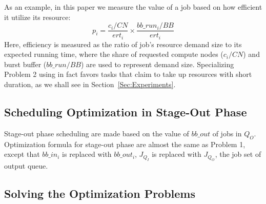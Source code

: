 As an example, in this paper we measure the value of a job based on how efficient it utilize its resource:
\begin{equation}
        p_i = \frac{c_i / CN}{ert_i} \times \frac{bb\_run_i / BB}{ert_i}
        \label{Equ:DefValue}
\end{equation}
Here, efficiency is measured as the ratio of job's resource demand size to its expected running time,
where the share of requested compute nodes ($c_i/CN$) and burst buffer ($bb\_run/BB$) are used to
represent demand size.
Specializing Problem 2 using  in fact favors tasks that claim to take up resources with short duration, as we shall see in Section~\ref{Sec:Experiments}.

\subsection{Scheduling Optimization in Stage-Out Phase}

Stage-out phase scheduling are made based on the value of $bb\_out$ of jobs in $Q_O$.
Optimization formula for stage-out phase are almost the same as
Problem 1, except that $bb\_in_i$ is replaced with $bb\_out_i$,
$J_{Q_I}$ is replaced with $J_{Q_O}$, the job set of output queue.


\subsection{Solving the Optimization Problems}

